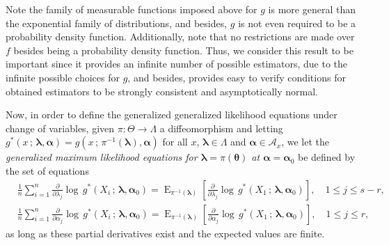 \documentclass[10pt,a4paper,onecolumn]{article} %
\newcommand{\bs}{\boldsymbol}
\newcommand{\on}{\operatorname}
\begin{document}
Note the family of measurable functions imposed above for $g$ is more general than the exponential family of distributions, and besides, $g$ is not even required to be a probability density function.
 Additionally, note that no restrictions are made over $f$ besides being a probability density function. Thus, we consider this result to be important since it provides an infinite number of possible estimators, due to the infinite possible choices for $g$, and besides, provides easy to verify conditions for obtained estimators to be strongly consistent and asymptotically normal.

Now, in order to define the generalized generalized likelihood equations under change of variables, given $\pi:\Theta\to \Lambda$ a diffeomorphism and letting $g^*(x\,;\, \bs{\lambda},\bs{\alpha})=g(x\,;\, \pi^{-1}(\bs{\lambda}),\bs{\alpha})$ for all $x$, $\bs{\lambda}\in \Lambda$ and $\bs{\alpha}\in \mathcal{A}_x$, we let the \textit{generalized maximum likelihood equations for $\bs{\lambda}=\pi(\bs{\theta})$ at $\bs{\alpha}=\bs{\alpha}_0$} be defined by the set of equations
\begin{equation}\label{modified2}
\begin{aligned}
&\frac{1}{n}\sum_{i=1}^n \frac{\partial}{\partial \lambda_j}  \log\, g^*(X_i\,;\,\bs{\lambda},\bs{\alpha}_0) = \on{E}_{\pi^{-1}(\bs{\lambda})}\left[\frac{\partial}{\partial \lambda_j}  \log\, g^*(X_1\,;\,\bs{\lambda},\bs{\alpha}_0)\right],\quad 1\leq j\leq s-r,\\ &\frac{1}{n}
\sum_{i=1}^n \frac{\partial}{\partial \alpha_j}  \log\, g^*(X_i\,;\,\bs{\lambda},\bs{\alpha}_0)=\on{E}_{\pi^{-1}(\bs{\lambda})}\left[\frac{\partial}{\partial \alpha_j}  \log\, g^*(X_1\,;\,\bs{\lambda},\bs{\alpha}_0)\right], \quad  1\leq j\leq r,
\end{aligned}
\end{equation}
as long as these partial derivatives exist and the expected values are finite.
\end{document}
